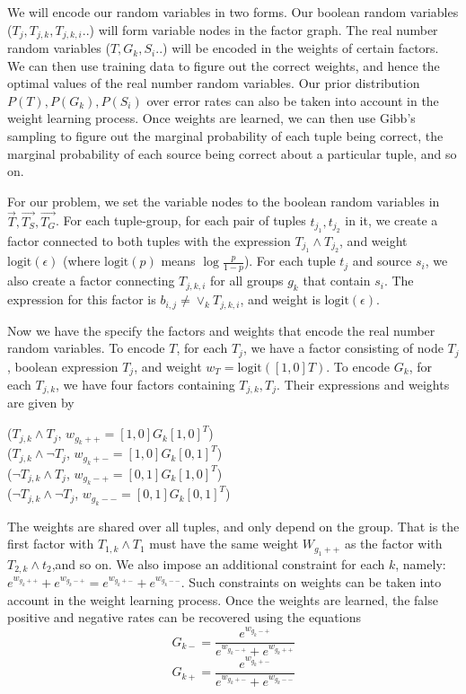 \documentclass{sig-alternate}
\newcounter{prob}
\newcommand{\logit}{\mathrm{logit}}
\begin{document}
We will encode our random variables in two forms. Our boolean random variables ($T_j, T_{j,k}, T_{j,k,i}..$) will form variable nodes in the factor graph. The real number random variables ($T, G_k, S_i..$) will be encoded in the weights of certain factors. We can then use training data to figure out the correct weights, and hence the optimal values of the real number random variables. Our prior distribution $P(T), P(G_k), P(S_i)$ over error rates can also be taken into account in the weight learning process. Once weights are learned, we can then use Gibb's sampling to figure out the marginal probability of each tuple being correct, the marginal probability of each source being correct about a particular tuple, and so on. 

For our problem, we set the variable nodes to the boolean random variables in $\overrightarrow{T}, \overrightarrow{T_S}, \overrightarrow{T_G}$. For each tuple-group, for each pair of tuples $t_{j_1}, t_{j_2}$ in it, we create a factor connected to both tuples with the expression $T_{j_1} \land T_{j_2}$, and weight $\logit(\epsilon)$ (where $\logit(p)$ means $\log\frac{p}{1-p}$). For each tuple $t_j$ and source $s_i$, we also create a factor connecting $T_{j,k,i}$ for all groups $g_k$ that contain $s_i$. The expression for this factor is $b_{i,j} \neq \lor_{k} T_{j,k,i}$, and weight is $\logit(\epsilon)$. 


Now we have the specify the factors and weights that encode the real number random variables. To encode $T$, for each $T_j$, we have a factor consisting of node $T_j$, boolean expression $T_j$, and weight $w_T = \logit([1,0]T)$. To encode $G_k$, for each $T_{j,k}$, we have four factors containing $T_{j,k}, T_{j}$. Their expressions and weights are given by
 
\noindent
($T_{j,k} \land T_j$, $w_{g_k++} = [1,0]G_k[1,0]^T$)\\ 
($T_{j,k} \land \lnot T_j$, $w_{g_k+-} = [1,0]G_k[0,1]^T$)\\
($\lnot T_{j,k} \land T_j$, $w_{g_k-+} = [0,1]G_k[1,0]^T$)\\ 
($\lnot T_{j,k} \land \lnot T_j$, $w_{g_k--} = [0,1]G_k[0,1]^T$)

The weights are shared over all tuples, and only depend on the group. That is the first factor with $T_{1,k} \land T_{1}$ must have the same weight $W_{g_1++}$ as the factor with $T_{2,k} \land t_2$,and so on. We also impose an additional constraint for each $k$, namely: $e^{w_{g_k++}} + e^{w_{g_k-+}} = e^{w_{g_k+-}} + e^{w_{g_k--}}$. Such constraints on weights can be taken into account in the weight learning process. Once the weights are learned, the false positive and negative rates can be recovered using the equations $$G_{k-} = \frac{e^{w_{g_k-+}}}{e^{w_{g_k-+}} + e^{w_{g_k++}}}$$ 
$$G_{k+} = \frac{e^{w_{g_k+-}}}{e^{w_{g_k+-}} + e^{w_{g_k--}}}$$
\end{document}
